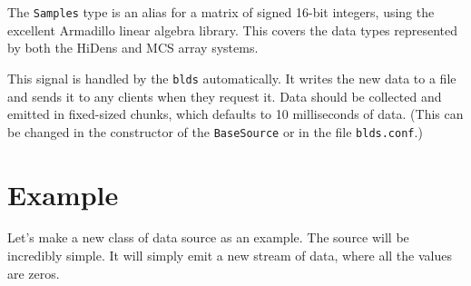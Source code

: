 \documentclass[12pt]{article}
\begin{document}
The \texttt{Samples} type is an alias for a matrix of signed 16-bit integers,
using the excellent Armadillo linear algebra library.
This covers the data types represented by both the HiDens and MCS array systems.

This signal is handled by the \texttt{blds} automatically. It writes the
new data to a file and sends it to any clients when they request it. Data
should be collected and emitted in fixed-sized chunks, which defaults to 10
milliseconds of data. (This can be changed in the constructor of the \texttt{BaseSource}
or in the file \texttt{blds.conf}.)

\section*{Example}

Let's make a new class of data source as an example. The source will be incredibly
simple. It will simply emit a new stream of data, where all the values are zeros.
\end{document}
